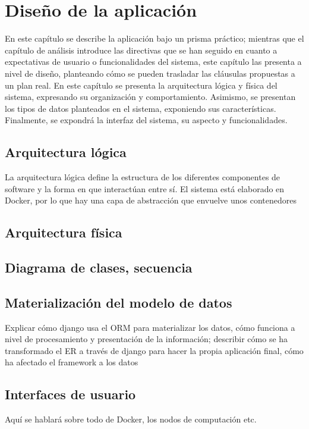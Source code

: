 \chapter{Diseño de la aplicación}
En este capítulo se describe la aplicación bajo un prisma práctico; mientras que el capítulo de análisis introduce las directivas que se han seguido en cuanto a expectativas de usuario o funcionalidades del sistema, este capítulo las presenta a nivel de diseño, planteando cómo se pueden trasladar las cláusulas propuestas a un plan real. En este capítulo se presenta la arquitectura lógica y física del sistema, expresando su organización y comportamiento. Asimismo, se presentan los tipos de datos planteados en el sistema, exponiendo sus características. Finalmente, se expondrá la interfaz del sistema, su aspecto y funcionalidades.
\section{Arquitectura lógica}
La arquitectura lógica define la estructura de los diferentes componentes de software y la forma en que interactúan entre sí. 
El sistema está elaborado en Docker, por lo que hay una capa de abstracción que envuelve unos contenedores
\section{Arquitectura física}
\section{Diagrama de clases, secuencia}
\section{Materialización del modelo de datos}
Explicar cómo django usa el ORM para materializar los datos, cómo funciona a nivel de procesamiento y presentación de la información; describir cómo se ha transformado el ER a través de django para hacer la propia aplicación final, cómo ha afectado el framework a los datos
\section{Interfaces de usuario}
Aquí se hablará sobre todo de Docker, los nodos de computación etc.